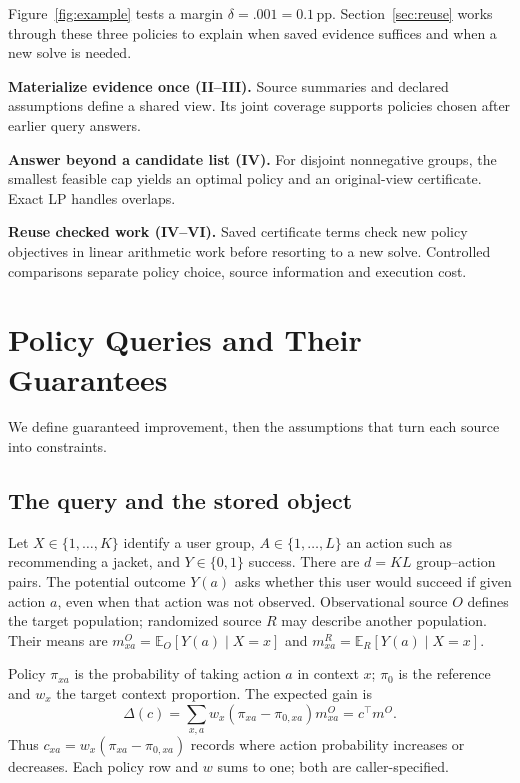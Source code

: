 \documentclass[conference]{IEEEtran}
\newcommand{\E}{\mathbb{E}}
\begin{document}
Figure~\ref{fig:example} tests a margin $\delta=.001=0.1$\,pp. Section~\ref{sec:reuse} works through these three policies to explain when saved evidence suffices and when a new solve is needed.

\textbf{Materialize evidence once (II--III).} Source summaries and declared assumptions define a shared view. Its joint coverage supports policies chosen after earlier query answers.

\textbf{Answer beyond a candidate list (IV).} For disjoint nonnegative groups, the smallest feasible cap yields an optimal policy and an original-view certificate. Exact LP handles overlaps.

\textbf{Reuse checked work (IV--VI).} Saved certificate terms check new policy objectives in linear arithmetic work before resorting to a new solve. Controlled comparisons separate policy choice, source information and execution cost.



\section{Policy Queries and Their Guarantees}\label{sec:contract}
We define guaranteed improvement, then the assumptions that turn each source into constraints.
\subsection{The query and the stored object}
Let $X\in\{1,\ldots,K\}$ identify a user group, $A\in\{1,\ldots,L\}$ an action such as recommending a jacket, and $Y\in\{0,1\}$ success. There are $d=KL$ group--action pairs. The potential outcome $Y(a)$ asks whether this user would succeed if given action $a$, even when that action was not observed. Observational source $O$ defines the target population; randomized source $R$ may describe another population. Their means are $m^O_{xa}=\E_O[Y(a)\mid X=x]$ and $m^R_{xa}=\E_R[Y(a)\mid X=x]$.

Policy $\pi_{xa}$ is the probability of taking action $a$ in context $x$; $\pi_0$ is the reference and $w_x$ the target context proportion. The expected gain is
\begin{equation}
 \Delta(c)=\sum_{x,a}w_x(\pi_{xa}-\pi_{0,xa})m^O_{xa}=c^\top m^O.\label{eq:query}
\end{equation}
Thus $c_{xa}=w_x(\pi_{xa}-\pi_{0,xa})$ records where action probability increases or decreases. Each policy row and $w$ sums to one; both are caller-specified.
\end{document}
